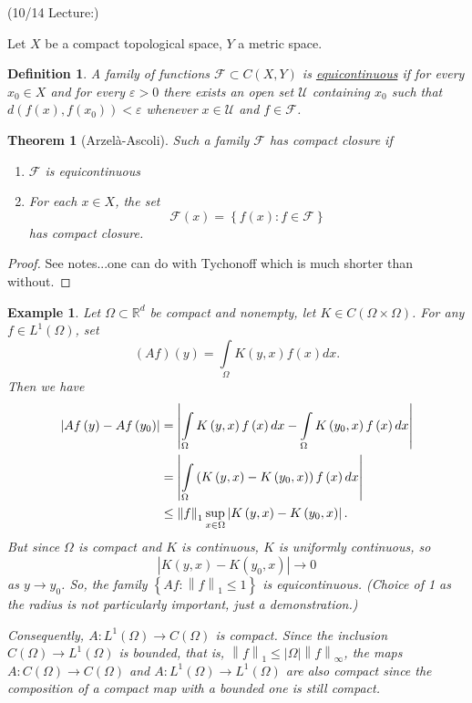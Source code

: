 \documentclass[letterpaper,twoside,11pt]{article}
\theoremstyle{mystyle}
\newtheorem*{thm}{Theorem}		%
\newtheorem{definition}{Definition}[section]
\newtheorem*{ex}{Example}
\newcommand{\R}{{\mathbb R}}
\newcommand{\cg}{\color{gray}}
\newcommand{\cbk}{\color{black}}
\begin{document}
\cg (10/14 Lecture:) \cbk

Let $X$ be a compact topological space, $Y$ a metric space. 
\begin{definition}
  A family of functions $\mathcal F \subset C(X,Y)$ is \underline{equicontinuous} if for every $x_0 \in X$ and for every $\varepsilon > 0$ there exists an open set $\mathcal U$ containing $x_0$ such that $d\left( {f\left( x \right),f\left( {{x_0}} \right)} \right) < \varepsilon $ whenever $x\in \mathcal U$ and $f\in \mathcal F$. 
\end{definition}

\begin{tcolorbox}[colback=red!5!white,colframe=red!75!black]
\begin{thm}[Arzel\`a-Ascoli]
  Such a family $\mathcal F$ has compact closure if 
  \begin{enumerate}
    \item $\mathcal F$ is equicontinuous
    \item For each $x\in X$, the set 
    \[\mathcal{F}\left( x \right) = \left\{ {f\left( x \right):f \in \mathcal{F}} \right\}\] 
    has compact closure. 
  \end{enumerate}
\end{thm}
\end{tcolorbox}
\begin{proof}
  See notes...one can do with Tychonoff which is much shorter than without. 
\end{proof}
\begin{ex}
  Let $\Omega \subset \R^d$ be compact and nonempty, let $K\in C(\Omega \times \Omega)$. For any $f\in L^1 (\Omega)$, set 
  \[\left( {Af} \right)\left( y \right) = \int\limits_\Omega  {K\left( {y,x} \right)f\left( x \right)dx} .\]
Then we have 
\begin{align*}
  \left| {Af\left( y \right) - Af\left( {{y_0}} \right)} \right| &= \left| {\int\limits_\Omega  {K\left( {y,x} \right)f\left( x \right)dx}  - \int\limits_\Omega  {K\left( {{y_0},x} \right)f\left( x \right)dx} } \right| \hfill \\
   &= \left| {\int\limits_\Omega  {\left( {K\left( {y,x} \right) - K\left( {{y_0},x} \right)} \right)f\left( x \right)dx} } \right| \hfill \\
   &\leq {\left\| f \right\|_1}\mathop {\sup }\limits_{x \in \Omega } \left| {K\left( {y,x} \right) - K\left( {{y_0},x} \right)} \right|. 
\end{align*} 
But since $\Omega$ is compact and $K$ is continuous, $K$ is uniformly continuous, so \[\left| {K\left( {y,x} \right) - K\left( {{y_0},x} \right)} \right| \to 0 \] as $y\to y_0$. So, the family $\left\{ {Af:{{\left\| f \right\|}_1} \leqslant 1} \right\}$ is equicontinuous. (Choice of 1 as the radius is not particularly important, just a demonstration.)

Consequently, $A: L^1(\Omega) \to C(\Omega)$ is compact. Since the inclusion $C(\Omega) \to L^1(\Omega)$ is bounded, that is, ${\left\| f \right\|_1} \leqslant \left| \Omega  \right|{\left\| f \right\|_\infty }$, the maps $A: C(\Omega) \to C(\Omega)$ and $A: L^1(\Omega) \to L^1(\Omega)$ are also compact since the composition of a compact map with a bounded one is still compact. 
\end{ex}
\end{document}
